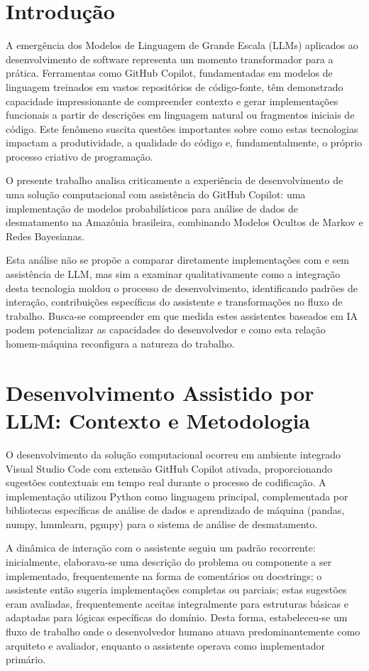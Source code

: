 \documentclass[12pt,a4paper]{article}
\begin{document}
\newpage

\section{Introdução}

A emergência dos Modelos de Linguagem de Grande Escala (LLMs) aplicados ao desenvolvimento de software representa um momento transformador para a prática. Ferramentas como GitHub Copilot, fundamentadas em modelos de linguagem treinados em vastos repositórios de código-fonte, têm demonstrado capacidade impressionante de compreender contexto e gerar implementações funcionais a partir de descrições em linguagem natural ou fragmentos iniciais de código. Este fenômeno suscita questões importantes sobre como estas tecnologias impactam a produtividade, a qualidade do código e, fundamentalmente, o próprio processo criativo de programação.

O presente trabalho analisa criticamente a experiência de desenvolvimento de uma solução computacional com assistência do GitHub Copilot: uma implementação de modelos probabilísticos para análise de dados de desmatamento na Amazônia brasileira, combinando Modelos Ocultos de Markov e Redes Bayesianas.

Esta análise não se propõe a comparar diretamente implementações com e sem assistência de LLM, mas sim a examinar qualitativamente como a integração desta tecnologia moldou o processo de desenvolvimento, identificando padrões de interação, contribuições específicas do assistente e transformações no fluxo de trabalho. Busca-se compreender em que medida estes assistentes baseados em IA podem potencializar as capacidades do desenvolvedor e como esta relação homem-máquina reconfigura a natureza do trabalho.

\section{Desenvolvimento Assistido por LLM: Contexto e Metodologia}

O desenvolvimento da solução computacional ocorreu em ambiente integrado Visual Studio Code com extensão GitHub Copilot ativada, proporcionando sugestões contextuais em tempo real durante o processo de codificação. A implementação utilizou Python como linguagem principal, complementada por bibliotecas específicas de análise de dados e aprendizado de máquina (pandas, numpy, hmmlearn, pgmpy) para o sistema de análise de desmatamento.

A dinâmica de interação com o assistente seguiu um padrão recorrente: inicialmente, elaborava-se uma descrição do problema ou componente a ser implementado, frequentemente na forma de comentários ou docstrings; o assistente então sugeria implementações completas ou parciais; estas sugestões eram avaliadas, frequentemente aceitas integralmente para estruturas básicas e adaptadas para lógicas específicas do domínio. Desta forma, estabeleceu-se um fluxo de trabalho onde o desenvolvedor humano atuava predominantemente como arquiteto e avaliador, enquanto o assistente operava como implementador primário.
\end{document}
